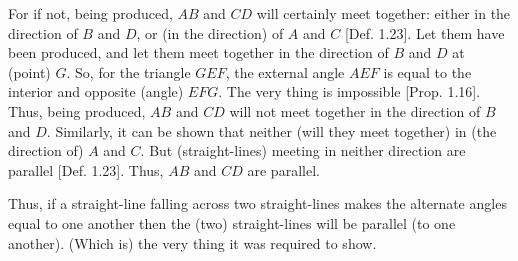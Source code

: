 \begin{Parallel}{}{}
{For if not, being produced, $AB$ and $CD$ will certainly meet together:
either in the direction of $B$ and $D$, or (in the
direction) of $A$ and $C$ [Def. 1.23]. Let them have been
produced, and let them meet together in the direction of $B$ and $D$ at
 (point) $G$. So, for the triangle $GEF$, the external angle
$AEF$ is equal to the interior and opposite (angle) $EFG$. The
very thing is impossible [Prop. 1.16]. Thus, being produced, $AB$ and $CD$
will not meet together in the direction of $B$ and $D$. Similarly, 
it can be shown that neither (will they meet together) in (the
direction of) $A$ and $C$. But  (straight-lines) meeting in neither
direction are parallel [Def. 1.23]. Thus, $AB$ and $CD$ are parallel.

Thus, if a straight-line falling across two straight-lines makes  the alternate
angles equal to one another then the (two) straight-lines will be parallel (to
one another). (Which is) the very thing it was required to show.}
\end{Parallel}

